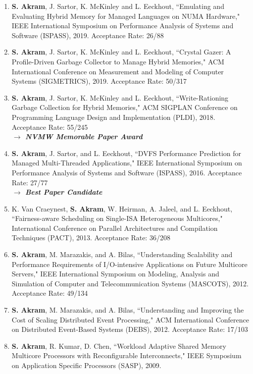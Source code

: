 \documentclass[singlecolumn,singlespace,11pt,a4paper]{article}
\begin{document}
\begin{enumerate}
\item
\textbf{S. Akram}, J. Sartor, K. McKinley and L. Eeckhout, ``Emulating and Evaluating Hybrid Memory for Managed Languages on NUMA Hardware," IEEE International Symposium on Performance Analysis of Systems and Software (ISPASS), 2019. {\color{blue} Acceptance Rate: 26/88}

\item 
\textbf{S. Akram}, J. Sartor, K. McKinley and L. Eeckhout, ``Crystal Gazer: A Profile-Driven Garbage 
Collector to Manage Hybrid Memories," ACM International Conference on Measurement and Modeling of Computer Systems
(SIGMETRICS), 2019. {\color{blue} Acceptance Rate: 50/317}

\item
\textbf{S. Akram}, J. Sartor, K. McKinley and L. Eeckhout, ``Write-Rationing Garbage Collection for Hybrid Memories," ACM SIGPLAN Conference on Programming Language Design and Implementation (PLDI), 2018. {\color{blue} Acceptance Rate: 55/245}
\\
{\color{BrickRed} \textbf{$\longrightarrow$ \emph{NVMW Memorable Paper Award}}}

\item
\textbf{S. Akram}, J. Sartor, and L. Eeckhout, ``DVFS Performance Prediction for Managed Multi-Threaded Applications," IEEE International Symposium on Performance Analysis 
of Systems and Software (ISPASS), 2016. {\color{blue} Acceptance Rate: 27/77} 
\\
{\color{BrickRed} \textbf{$\longrightarrow$ \emph{Best Paper Candidate}}}

\item
K. Van Craeynest, \textbf{S. Akram}, W. Heirman, A. Jaleel, and L. Eeckhout, ``Fairness-aware Scheduling on Single-ISA Heterogeneous Multicores," 
International Conference on Parallel Architectures and Compilation Techniques (PACT), 2013. {\color{blue} Acceptance Rate: 36/208}

\item
\textbf{S. Akram}, M. Marazakis, and A. Bilas, ``Understanding Scalability and Performance Requirements of I/O-intensive Applications
on Future Multicore Servers," IEEE International Symposium on Modeling, Analysis and Simulation of Computer and 
Telecommunication Systems (MASCOTS), 2012. {\color{blue} Acceptance Rate: 49/134}

\item 
\textbf{S. Akram}, M. Marazakis, and A. Bilas, ``Understanding and Improving the Cost of Scaling Distributed Event Processing," 
ACM International Conference on Distributed Event-Based Systems (DEBS), 2012. {\color{blue} Acceptance Rate: 17/103}

\item
\textbf{S. Akram}, R. Kumar, D. Chen, ``Workload Adaptive Shared Memory Multicore Processors with Reconfigurable Interconnects,"
IEEE Symposium on Application Specific Processors (SASP), 2009. 


\end{enumerate}
\end{document}
